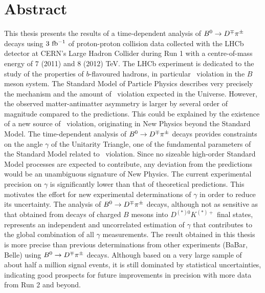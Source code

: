 

\cleardoublepage
\chapter*{Abstract}
\vskip0.2cm
This thesis presents the results of a time-dependent analysis of $B^0\rightarrow D^\mp\pi^\pm$ decays using $3~\rm fb^{-1}$ of 
proton-proton collision data collected
with the LHCb detector at CERN's Large Hadron Collider during Run 1 with a centre-of-mass energy of $7$ (2011) and $8$ (2012) TeV.
The LHCb experiment is dedicated to the study of the properties
of $b$-flavoured hadrons, in particular \CP~violation in the $B$ meson system.
The Standard Model of Particle Physics
describes very precisely the mechanism and the amount of \CP~violation expected in the Universe.
However, the observed matter-antimatter asymmetry is larger by several order of magnitude
compared to the predictions. This could be explained by the existence of a new source of \CP~violation, originating in
New Physics beyond the Standard Model.
The time-dependent analysis of $B^0\rightarrow D^\mp\pi^\pm$ decays provides constraints on
the angle $\gamma$ of the Unitarity Triangle, one of the fundamental parameters
of the Standard Model related to \CP~violation. Since no sizeable high-order Standard Model processes are expected to contribute,
any deviation from the predictions would be an unambiguous signature
of New Physics.
The current experimental precision on $\gamma$ is significantly lower than that of theoretical predictions.
This motivates the effort for new experimental determinations of $\gamma$ in order to reduce its uncertainty.
The analysis of $B^0\rightarrow D^\mp\pi^\pm$ decays, although not as sensitive as that obtained from decays of
charged $B$ mesons into $D^{(*)0}K^{(*)+}$ final states, represents an independent and uncorrelated estimation of $\gamma$
that contributes to the global combination of all $\gamma$ measurements. The result obtained in this thesis is more precise than previous
determinations from other experiments (BaBar, Belle) using $B^0\rightarrow D^\mp\pi^\pm$ decays.
Although based on a very large sample of about half a million signal events, it is still dominated by statistical uncertainties,
indicating good prospects for future improvements in precision with more data from Run 2 and beyond. \\
